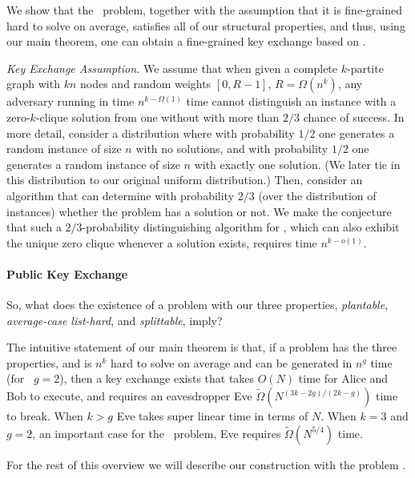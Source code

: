 We show that the \zkclique~problem, together with the assumption that it is fine-grained hard to solve on average, satisfies all of our structural properties, and thus, using our main theorem, one can obtain a fine-grained key exchange based on 
\zkclique.

\textit{Key Exchange Assumption.} We assume that when given a complete $k$-partite graph with $kn$ nodes and random weights $[0,R-1]$, $R = \Omega(n^k)$, any adversary running in time $n^{k-\Omega(1)}$ time cannot distinguish an instance with a zero-$k$-clique solution from one without with more than $2/3$ chance of success.
In more detail, consider a distribution where with probability $1/2$ one generates a random instance of size $n$ with no solutions, and with probability $1/2$ one generates a random instance of size $n$ with exactly one solution. (We later tie in this distribution to our original uniform distribution.) Then, consider an algorithm that can determine with probability $2/3$ (over the distribution of instances) whether the problem has a solution or not.
We make the conjecture that such a $2/3$-probability distinguishing algorithm for \zkclique, which can also exhibit the unique zero clique whenever a solution exists, 
requires time $n^{k-o(1)}$.



\paragraph{Public Key Exchange}

So, what does the existence of a problem with our three properties, \emph{plantable}, \emph{average-case list-hard}, and \emph{splittable}, imply?

The intuitive statement of our main theorem is that, if a problem has the three properties, and is $n^k$ hard to solve on average and can be generated in $n^g$ time (for \zkclique~$g=2$), then a key exchange exists that takes $O(N)$ time for Alice and Bob to execute, and requires an eavesdropper Eve $\tilde{\Omega}(N^{(3k-2g)/(2k-g)})$ time to break. When $k>g$ Eve takes super linear time in terms of $N$. When $k=3$ and $g=2$, an important case for the \zkclique~problem, Eve requires $\tilde{\Omega}(N^{5/4})$ time. 

For the rest of this overview we will describe our construction with the problem \zkclique. 

